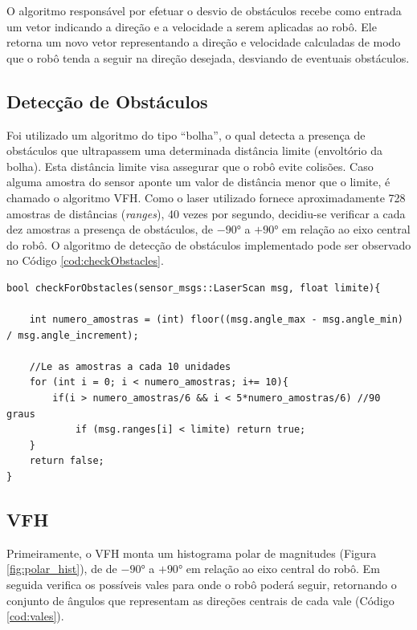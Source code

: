 O algoritmo responsável por efetuar o desvio de obstáculos recebe como
entrada um vetor indicando a direção e a velocidade a serem aplicadas
ao robô. Ele retorna um novo vetor representando a direção e velocidade
calculadas de modo que o robô tenda a seguir na direção desejada,
desviando de eventuais obstáculos.

\subsection{Detecção de Obstáculos}

Foi utilizado um algoritmo do tipo ``bolha'', o qual detecta a
presença de obstáculos que ultrapassem uma determinada distância
limite (envoltório da bolha). Esta distância limite visa assegurar que
o robô evite colisões. Caso alguma amostra do sensor aponte um valor
de distância menor que o limite, é chamado o algoritmo VFH. Como o
laser utilizado fornece aproximadamente 728 amostras de distâncias
(\textit{ranges}), 40 vezes por segundo, decidiu-se verificar a cada
dez amostras a presença de obstáculos, de $-90°$ a $+90°$ em relação
ao eixo central do robô. O algoritmo de detecção de obstáculos
implementado pode ser observado no Código \ref{cod:checkObstacles}.

\begin{lstlisting}[frame=single, label=cod:checkObstacles, style=customc,
caption={Algoritmo de Verificação de Obstáculos}]
bool checkForObstacles(sensor_msgs::LaserScan msg, float limite){
    
    int numero_amostras = (int) floor((msg.angle_max - msg.angle_min) / msg.angle_increment);
    
    //Le as amostras a cada 10 unidades
    for (int i = 0; i < numero_amostras; i+= 10){
        if(i > numero_amostras/6 && i < 5*numero_amostras/6) //90 graus
            if (msg.ranges[i] < limite) return true;
    }
    return false;
}
\end{lstlisting}


\subsection{VFH}

Primeiramente, o VFH monta um histograma polar de magnitudes (Figura
\ref{fig:polar_hist}), de de $-90°$ a $+90°$ em relação ao eixo central do
robô. Em seguida verifica os possíveis vales para onde o robô poderá
seguir, retornando o conjunto de ângulos que representam as direções
centrais de cada vale (Código \ref{cod:vales}).

